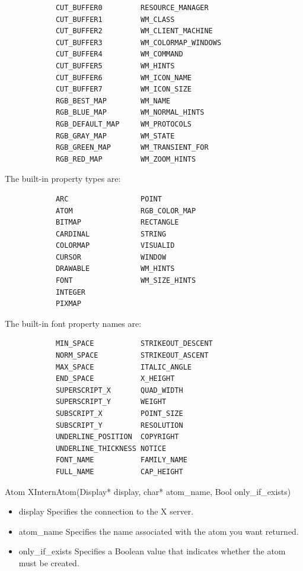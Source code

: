 \documentclass{report}
\begin{document}
\begin{itemize}
        \begin{verbatim}
            CUT_BUFFER0         RESOURCE_MANAGER
            CUT_BUFFER1         WM_CLASS
            CUT_BUFFER2         WM_CLIENT_MACHINE
            CUT_BUFFER3         WM_COLORMAP_WINDOWS
            CUT_BUFFER4         WM_COMMAND
            CUT_BUFFER5         WM_HINTS
            CUT_BUFFER6         WM_ICON_NAME
            CUT_BUFFER7         WM_ICON_SIZE
            RGB_BEST_MAP        WM_NAME
            RGB_BLUE_MAP        WM_NORMAL_HINTS
            RGB_DEFAULT_MAP     WM_PROTOCOLS
            RGB_GRAY_MAP        WM_STATE
            RGB_GREEN_MAP       WM_TRANSIENT_FOR
            RGB_RED_MAP         WM_ZOOM_HINTS
        \end{verbatim}
        The built-in property types are:
        \begin{verbatim}
            ARC                 POINT
            ATOM                RGB_COLOR_MAP
            BITMAP              RECTANGLE
            CARDINAL            STRING
            COLORMAP            VISUALID
            CURSOR              WINDOW
            DRAWABLE            WM_HINTS
            FONT                WM_SIZE_HINTS
            INTEGER
            PIXMAP 
        \end{verbatim}
        The built-in font property names are:
        \begin{verbatim}
            MIN_SPACE           STRIKEOUT_DESCENT
            NORM_SPACE          STRIKEOUT_ASCENT
            MAX_SPACE           ITALIC_ANGLE
            END_SPACE           X_HEIGHT
            SUPERSCRIPT_X       QUAD_WIDTH
            SUPERSCRIPT_Y       WEIGHT
            SUBSCRIPT_X         POINT_SIZE
            SUBSCRIPT_Y         RESOLUTION
            UNDERLINE_POSITION  COPYRIGHT
            UNDERLINE_THICKNESS NOTICE
            FONT_NAME           FAMILY_NAME
            FULL_NAME           CAP_HEIGHT 
        \end{verbatim}
        \bigbreak \noindent 
        \begin{cppcode}
            Atom XInternAtom(Display* display, char* atom_name, Bool only_if_exists)
        \end{cppcode}
        \bigbreak \noindent
        \begin{itemize}
            \item display Specifies the connection to the X server.
            \item atom\_name Specifies the name associated with the atom you want returned.
            \item only\_if\_exists Specifies a Boolean value that indicates whether the atom must be created.

\end{itemize}
\end{itemize}
\end{document}
